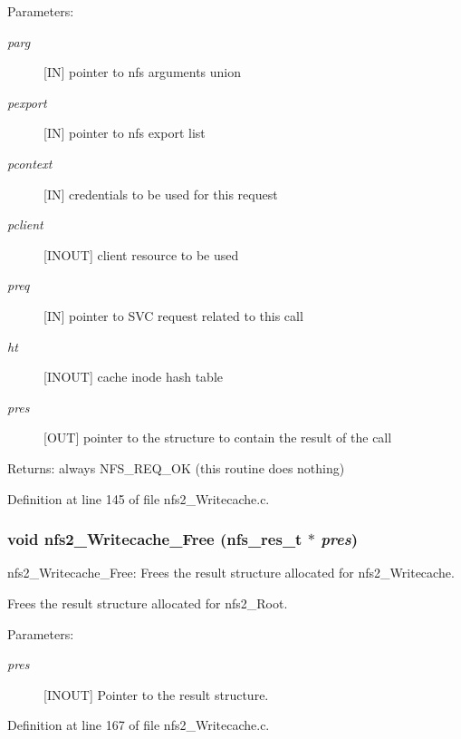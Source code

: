 \begin{Desc}
\item[Parameters:]
\begin{description}
\item[{\em parg}][IN] pointer to nfs arguments union \item[{\em pexport}][IN] pointer to nfs export list \item[{\em pcontext}][IN] credentials to be used for this request \item[{\em pclient}][INOUT] client resource to be used \item[{\em preq}][IN] pointer to SVC request related to this call \item[{\em ht}][INOUT] cache inode hash table \item[{\em pres}][OUT] pointer to the structure to contain the result of the call\end{description}
\end{Desc}
\begin{Desc}
\item[Returns:]always NFS\_\-REQ\_\-OK (this routine does nothing) \end{Desc}


Definition at line 145 of file nfs2\_\-Writecache.c.
\subsubsection[{nfs2\_\-Writecache\_\-Free}]{\setlength{\rightskip}{0pt plus 5cm}void nfs2\_\-Writecache\_\-Free (nfs\_\-res\_\-t $\ast$ {\em pres})}\label{nfs2__Writecache_8c_e8612a8951c969d29ed4a48b5b5dc13e}


nfs2\_\-Writecache\_\-Free: Frees the result structure allocated for nfs2\_\-Writecache.

Frees the result structure allocated for nfs2\_\-Root.

\begin{Desc}
\item[Parameters:]
\begin{description}
\item[{\em pres}][INOUT] Pointer to the result structure. \end{description}
\end{Desc}


Definition at line 167 of file nfs2\_\-Writecache.c.